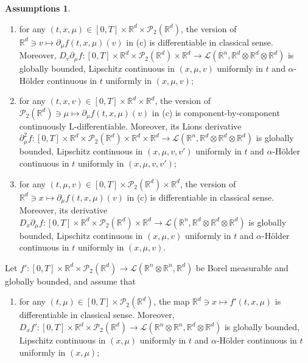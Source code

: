 \documentclass[10pt, a4paper]{article} %
\newcommand{\R}{\mathbb{R}}
\theoremstyle{definition}
\newtheorem{assumptions}[defn]{Assumptions}
\theoremstyle{plain}
\begin{document}
\begin{assumptions}
\begin{enumerate}
        \item for any $(t, x, \mu) \in [0, T] \times \mathbb{R}^d \times \mathcal{P}_2 (\mathbb{R}^d)$, the version of $\mathbb{R}^d \ni v \mapsto \partial_{\mu} f (t, x, \mu) (v)$ in (c) is differentiable in classical sense. Moreover, $D_v \partial_{\mu} f : [0,T] \times \mathbb{R}^d \times \mathcal{P}_2 (\mathbb{R}^d) \times \mathbb{R}^d \rightarrow \mathscr{L} (\mathbb{R}^n , \mathbb{R}^d \otimes \mathbb{R}^d \otimes \mathbb{R}^d)$ is globally bounded, Lipschitz continuous in $(x, \mu, v)$ uniformly in $t$ and $\alpha$-H\"older continuous in $t$ uniformly in $(x, \mu, v)$;
    
        \item for any $(t, x, v) \in [0, T] \times \mathbb{R}^d \times \mathbb{R}^d$, the version of $\mathcal{P}_2 (\mathbb{R}^d) \ni \mu \mapsto \partial_{\mu} f (t, x, \mu) (v)$ in (c) is component-by-component continuously L-differentiable. Moreover, its Lions derivative $\partial_{\mu}^2 f : [0,T] \times \R^d \times \mathcal{P}_2(\R^d) \times \R^d \times \R^d \to \mathscr{L}(\R^n,\R^d \otimes \R^d \otimes \R^d)$ is globally bounded, Lipschitz continuous in $(x, \mu, v, v')$ uniformly in $t$ and $\alpha$-H\"older continuous in $t$ uniformly in $(x, \mu, v, v')$;
    
        \item for any $(t, \mu, v) \in [0, T] \times \mathcal{P}_2 (\mathbb{R}^d) \times \mathbb{R}^d$, the version of $\mathbb{R}^d \ni x \mapsto \partial_{\mu} f (t, x, \mu) (v)$ in (c) is differentiable in classical sense. Moreover, its derivative $D_x \partial_{\mu} f : [0,T] \times \R^d \times \mathcal{P}_2(\R^d) \times \R^d \to \mathscr{L}(\R^n,\R^d \otimes \R^d \otimes \R^d)$ is globally bounded, Lipschitz continuous in $(x, \mu, v)$ uniformly in $t$ and $\alpha$-H\"older continuous in $t$ uniformly in $(x, \mu, v)$.
    \end{enumerate}
    Let $f':[0,T] \times \R^d \times \mathcal{P}_2(\R^d) \to \mathscr{L}(\R^n \otimes \R^n ,\R^d)$ be Borel measurable and globally bounded, and assume that 
    \begin{enumerate} \renewcommand{\labelenumi}{(\alph{enumi})} \setcounter{enumi}{6}        
        \item for any $(t, \mu) \in [0, T] \times \mathcal{P}_2 (\mathbb{R}^d)$, the map $\mathbb{R}^d \ni x \mapsto f' (t, x, \mu)$ is differentiable in classical sense. Moreover, $D_x f ' : [0, T] \times \mathbb{R}^d \times \mathcal{P}_2 (\mathbb{R}^d) \rightarrow \mathscr{L} (\mathbb{R}^n \otimes \mathbb{R}^n , \mathbb{R}^d \otimes \mathbb{R}^d)$ is globally bounded, Lipschitz continuous in $(x, \mu)$ uniformly in $t$ and $\alpha$-H\"older continuous in $t$ uniformly in $(x, \mu)$;
    

\end{enumerate}
\end{assumptions}
\end{document}
